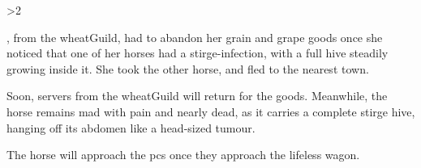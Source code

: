 \ifnum\value{temperature}>2

%
\begin{exampletext}
  \composeHumanName,  from the \gls{wheatGuild}, had to abandon her grain and grape goods once she noticed that one of her horses had a stirge-infection, with a full hive steadily growing inside it.
  She took the other horse, and fled to the nearest town.
\end{exampletext}

\vspace{-1\baselineskip}
Soon, \glspl{server} from the \gls{wheatGuild} will return for the goods.
Meanwhile, the horse remains mad with pain and nearly dead, as it carries a complete stirge hive, hanging off its abdomen like a head-sized tumour.

\stirgeSwarm

The horse will approach the \glspl{pc} once they approach the lifeless wagon.

\fi
